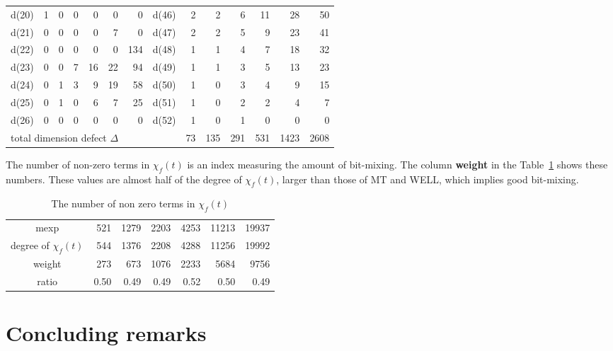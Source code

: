 \documentclass{svmult}
\begin{document}
\begin{table}
\begin{center}
\begin{tabular}{|r|rrrrrr||r|rrrrrr|}
      d(20) & 1 & 0 & 0 & 0 & 0 & 0 & d(46) & 2 & 2 & 6 & 11 & 28 & 50 \\
      d(21) & 0 & 0 & 0 & 0 & 7 & 0 & d(47) & 2 & 2 & 5 & 9 & 23 & 41 \\
      d(22) & 0 & 0 & 0 & 0 & 0 & 134 & d(48) & 1 & 1 & 4 & 7 & 18 & 32 \\
      d(23) & 0 & 0 & 7 & 16 & 22 & 94 & d(49) & 1 & 1 & 3 & 5 & 13 & 23 \\
      d(24) & 0 & 1 & 3 & 9 & 19 & 58 & d(50) & 1 & 0 & 3 & 4 & 9 & 15 \\
      d(25) & 0 & 1 & 0 & 6 & 7 & 25 & d(51) & 1 & 0 & 2 & 2 & 4 & 7 \\
      d(26) & 0 & 0 & 0 & 0 & 0 & 0 & d(52) & 1 & 0 & 1 & 0 & 0 & 0 \\ \hline
      \multicolumn{8}{|l|}{total dimension defect $\Delta$} 
      & 73 & 135 & 291 & 531 & 1423 & 2608 \\ \hline
    \end{tabular}
  \end{center}
\end{table}

\begin{remark}
  The number of non-zero terms in $\chi_f(t)$ is an index measuring
  the amount of bit-mixing.  The column \textbf{weight} in the 
  Table~\ref{tab:weight} shows these numbers. These values are almost
  half of the degree of $\chi_f(t)$, larger than those of MT
  and WELL, which implies good bit-mixing.
\end{remark}

\begin{table}[h]
  \begin{center}
    \caption{The number of non zero terms in $\chi_f(t)$}
    \label{tab:weight}
    \begin{tabular}{c|rrrrrr} \hline
      mexp & 521 & 1279 & 2203 & 4253 & 11213 & 19937 \\
      degree of $\chi_f(t)$ & 544 & 1376 & 2208 & 4288 & 11256 & 19992 \\
      weight & 273 & 673 & 1076 & 2233 & 5684 & 9756 \\ 
      ratio & 0.50 & 0.49 & 0.49 & 0.52 & 0.50 & 0.49 \\ \hline
    \end{tabular}
  \end{center}
\end{table}
\section{Concluding remarks}
\end{document}
